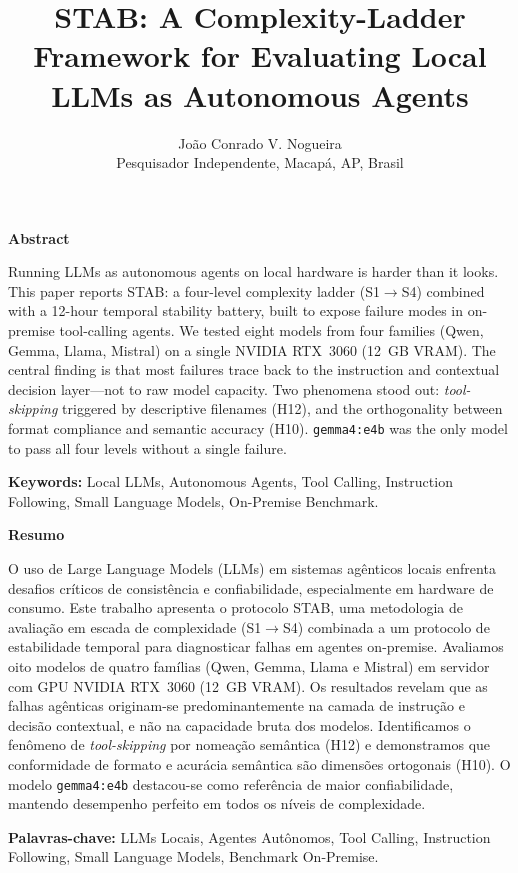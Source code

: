 \documentclass{kdmile}
\title{STAB: A Complexity-Ladder Framework for Evaluating Local LLMs as Autonomous Agents}
\author{
  João Conrado V. Nogueira\\
  {\small Pesquisador Independente, Macapá, AP, Brasil}
}
\newenvironment{abstracten}{%
  \vspace{4pt}\begin{center}\normalsize\bfseries Abstract\end{center}%
  \noindent\small\ignorespaces
}{\normalsize\vspace{4pt}}
\newenvironment{resumo}{%
  \vspace{4pt}\begin{center}\normalsize\bfseries Resumo\end{center}%
  \noindent\small\ignorespaces
}{\normalsize\vspace{4pt}}
\begin{document}
\maketitle
\gdef\@runningfoot{\@journalName, KDMiLe 2026.}
\gdef\@firstfoot{\@journalName, KDMiLe 2026.}

\begin{abstracten}
Running LLMs as autonomous agents on local hardware is harder than it looks.
%
This paper reports STAB: a four-level complexity ladder (S1$\rightarrow$S4)
combined with a 12-hour temporal stability battery, built to expose
failure modes in on-premise tool-calling agents.
%
We tested eight models from four families (Qwen, Gemma, Llama, Mistral)
on a single NVIDIA RTX~3060 (12~GB VRAM).
%
The central finding is that most failures trace back to the instruction and
contextual decision layer—not to raw model capacity.
%
Two phenomena stood out: \emph{tool-skipping} triggered by descriptive
filenames (H12), and the orthogonality between format compliance and semantic
accuracy (H10).
%
\texttt{gemma4:e4b} was the only model to pass all four levels without a
single failure.

\textbf{Keywords:} Local LLMs, Autonomous Agents, Tool Calling, Instruction
Following, Small Language Models, On-Premise Benchmark.
\end{abstracten}

\begin{resumo}
O uso de Large Language Models (LLMs) em sistemas agênticos locais enfrenta
desafios críticos de consistência e confiabilidade, especialmente em hardware
de consumo.
%
Este trabalho apresenta o protocolo STAB, uma metodologia de avaliação em escada
de complexidade (S1$\rightarrow$S4) combinada a um protocolo de estabilidade
temporal para diagnosticar falhas em agentes on-premise.
%
Avaliamos oito modelos de quatro famílias (Qwen, Gemma, Llama e Mistral) em
servidor com GPU NVIDIA RTX~3060 (12~GB VRAM).
%
Os resultados revelam que as falhas agênticas originam-se predominantemente na
camada de instrução e decisão contextual, e não na capacidade bruta dos modelos.
%
Identificamos o fenômeno de \emph{tool-skipping} por nomeação semântica (H12) e
demonstramos que conformidade de formato e acurácia semântica são dimensões
ortogonais (H10).
%
O modelo \texttt{gemma4:e4b} destacou-se como referência de maior
confiabilidade, mantendo desempenho perfeito em todos os níveis de complexidade.

\textbf{Palavras-chave:} LLMs Locais, Agentes Autônomos, Tool Calling,
Instruction Following, Small Language Models, Benchmark On-Premise.
\end{resumo}
\end{document}
